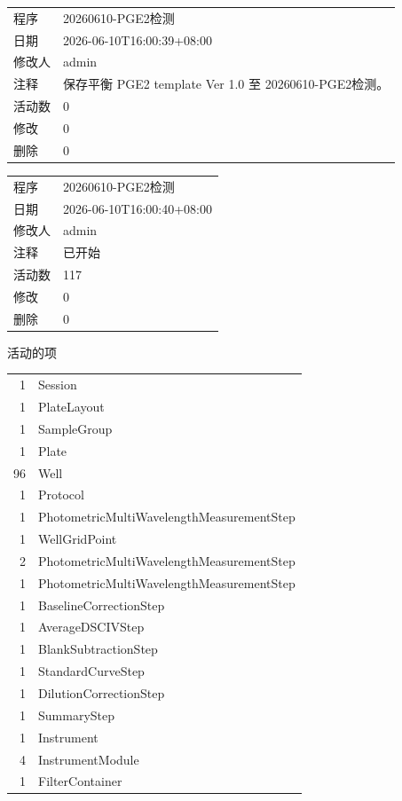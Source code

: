 \documentclass[UTF8,10pt,a4paper,fontset=fandol]{ctexart}
\begin{document}
\noindent
\begin{tabular}{@{}p{3.2cm}p{11.5cm}@{}}
程序 & 20260610-PGE2检测\\
日期 & 2026-06-10T16:00:39+08:00\\
修改人 & admin\\
注释 & 保存平衡 PGE2 template Ver 1.0 至 20260610-PGE2检测。\\
活动数 & 0\\
修改 & 0\\
删除 & 0\\
\end{tabular}

\vspace{1em}

\noindent
\begin{tabular}{@{}p{3.2cm}p{11.5cm}@{}}
程序 & 20260610-PGE2检测\\
日期 & 2026-06-10T16:00:40+08:00\\
修改人 & admin\\
注释 & 已开始\\
活动数 & 117\\
修改 & 0\\
删除 & 0\\
\end{tabular}

\noindent
活动的项

\begin{tabular}{@{}r@{\quad}l@{}}
1 & Session\\
1 & PlateLayout\\
1 & SampleGroup\\
1 & Plate\\
96 & Well\\
1 & Protocol\\
1 & PhotometricMultiWavelengthMeasurementStep\\
1 & WellGridPoint\\
2 & PhotometricMultiWavelengthMeasurementStep\\
1 & PhotometricMultiWavelengthMeasurementStep\\
1 & BaselineCorrectionStep\\
1 & AverageDSCIVStep\\
1 & BlankSubtractionStep\\
1 & StandardCurveStep\\
1 & DilutionCorrectionStep\\
1 & SummaryStep\\
1 & Instrument\\
4 & InstrumentModule\\
1 & FilterContainer\\
\end{tabular}
\end{document}
